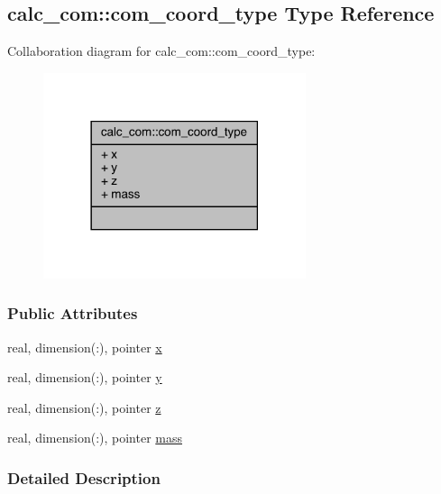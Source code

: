 \hypertarget{structcalc__com_1_1com__coord__type}{\subsection{calc\-\_\-com\-:\-:com\-\_\-coord\-\_\-type Type Reference}
\label{structcalc__com_1_1com__coord__type}
}


Collaboration diagram for calc\-\_\-com\-:\-:com\-\_\-coord\-\_\-type\-:
\nopagebreak
\begin{figure}[H]
\begin{center}
\leavevmode
\includegraphics[width=218pt]{structcalc__com_1_1com__coord__type__coll__graph}
\end{center}
\end{figure}
\subsubsection*{Public Attributes}
\begin{DoxyCompactItemize}
\item 
real, dimension(\-:), pointer \hyperlink{structcalc__com_1_1com__coord__type_a49ea4855283823674030d9aa646af021}{x}
\item 
real, dimension(\-:), pointer \hyperlink{structcalc__com_1_1com__coord__type_aeb14c59fa53674fda40bf26a1826e6b7}{y}
\item 
real, dimension(\-:), pointer \hyperlink{structcalc__com_1_1com__coord__type_a94700d8339fec547c9b5156f5439ca88}{z}
\item 
real, dimension(\-:), pointer \hyperlink{structcalc__com_1_1com__coord__type_ae60027dd2b949a9eb83f4e4a4e351844}{mass}
\end{DoxyCompactItemize}


\subsubsection{Detailed Description}


